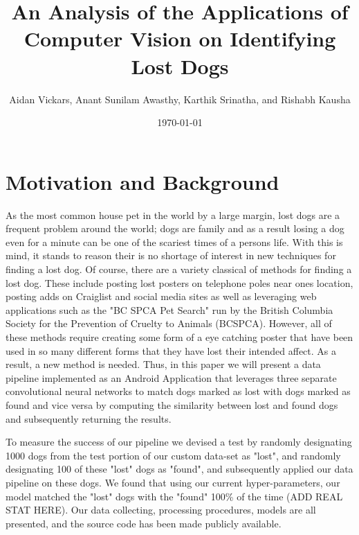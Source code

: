 \documentclass{article}
\title{An Analysis of the Applications of Computer Vision on Identifying Lost Dogs}
\author{Aidan Vickars, Anant Sunilam Awasthy, Karthik Srinatha, and Rishabh Kausha}
\date{\today}
\begin{document}
\maketitle

\newpage
\section{Motivation and Background}
As the most common house pet in the world by a large margin, lost dogs are a frequent problem around the world; dogs are family and as a result losing a dog even for a minute can be one of the scariest times of a persons life.  With this is mind, it stands to reason their is no shortage of interest in new techniques for finding a lost dog.  Of course, there are a variety classical of methods for finding a lost dog.  These include posting lost posters on telephone poles near ones location, posting adds on Craiglist and social media sites as well as leveraging web applications such as the "BC SPCA Pet Search" run by the British Columbia Society for the Prevention of Cruelty to Animals (BCSPCA).  However, all of these methods require creating some form of a eye catching poster that have been used in so many different forms that they have lost their intended affect.  As a result, a new method is needed.  Thus, in this paper we will present a data pipeline implemented as an Android Application that leverages three separate convolutional neural networks to match dogs marked as lost with dogs marked as found and vice versa by computing the similarity between lost and found dogs and subsequently returning the results.

To measure the success of our pipeline we devised a test by randomly designating 1000 dogs from the test portion of our custom data-set as "lost", and randomly designating 100 of these "lost" dogs as "found", and subsequently applied our data pipeline on these dogs.  We found that using our current hyper-parameters, our model matched the "lost" dogs with the "found" 100\% of the time (ADD REAL STAT HERE).  Our data collecting, processing procedures, models are all presented, and the source code has been made publicly available.
\end{document}
